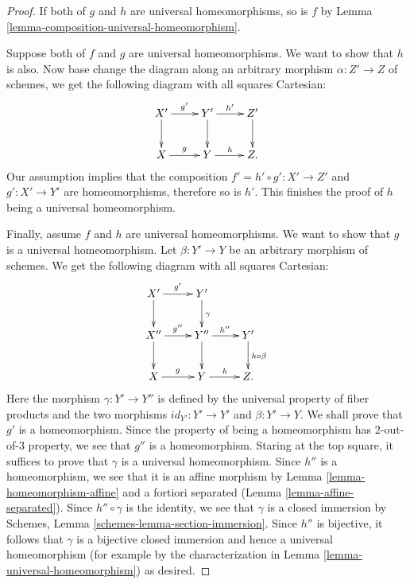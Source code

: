 \documentclass[10pt,a4paper]{amsart}
\theoremstyle{plain}
\theoremstyle{definition}
\theoremstyle{remark}
\numberwithin{equation}{subsection}
\begin{document}
\begin{proof}
If both of $g$ and $h$ are universal homeomorphisms, so is $f$ by
Lemma \ref{lemma-composition-universal-homeomorphism}.

\medskip\noindent
Suppose both of $f$ and $g$ are universal homeomorphisms. We want to show
that $h$ is also. Now base change the diagram along an arbitrary morphism
$\alpha : Z' \to Z$ of schemes,  we get the following diagram with all
squares Cartesian:
$$
\xymatrix{
X' \ar[r]^{g'} \ar[d] & Y' \ar[r]^{h'} \ar[d] & Z' \ar[d] \\
X \ar[r]^{g} & Y \ar[r]^{h} & Z.
}
$$
Our assumption implies that the composition $f'= h' \circ g' : X' \to Z'$
and $g' : X' \to Y'$ are homeomorphisms, therefore so is $h'$.
This finishes the proof of $h$ being a universal homeomorphism.

\medskip\noindent
Finally, assume $f$ and $h$ are universal
homeomorphisms. We want to show that $g$ is a universal homeomorphism.
Let $\beta : Y' \to Y$ be an arbitrary morphism of schemes.
We get the following diagram with all squares Cartesian:
$$
\xymatrix{
X' \ar[r]^{g'} \ar[d] & Y' \ar[d]^{\gamma} & \\
X'' \ar[r]^{g''} \ar[d] & Y'' \ar[r]^{h''} \ar[d] & Y' \ar[d]^{h \circ \beta} \\
X \ar[r]^{g} & Y \ar[r]^{h} & Z.
}
$$
Here the morphism $\gamma : Y' \to Y''$ is defined by the universal property of
fiber products and the two morphisms
$id_{Y'} : Y' \to Y'$ and $\beta : Y' \to Y$.
We shall prove that $g'$ is a homeomorphism.
Since the property of being a homeomorphism has 2-out-of-3 property, we see
that $g''$ is a homeomorphism.
Staring at the top square, it suffices to prove that $\gamma$ is a universal
homeomorphism. Since $h''$ is a homeomorphism, we see that it is
an affine morphism by Lemma \ref{lemma-homeomorphism-affine}
and a fortiori separated (Lemma \ref{lemma-affine-separated}).
Since $h'' \circ \gamma$ is the identity, we see that $\gamma$
is a closed immersion by
Schemes, Lemma \ref{schemes-lemma-section-immersion}.
Since $h''$ is bijective, it follows that $\gamma$ is a bijective
closed immersion and hence a universal homeomorphism (for example by the
characterization in Lemma \ref{lemma-universal-homeomorphism}) as desired.
\end{proof}
\end{document}
